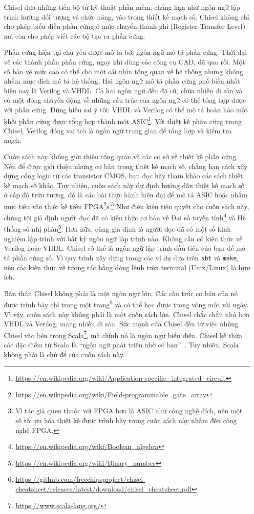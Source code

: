\documentclass[%
    10pt,
    headinclude, footexclude,
    openright, %
    notitlepage,
    cleardoubleempty,
    headsepline,
    pointlessnumbers,
    bibtotoc, idxtotoc,
    ]{scrbook}
\newcommand{\code}[1]{{\small{\texttt{#1}}}}
\newcommand{\myref}[2]{\href{#1}{#2}}
\renewcommand{\myref}[2]{{#2}{\footnote{\url{#1}}}}
\begin{document}
Chisel đưa những tiến bộ từ kỹ thuật phần mềm, chẳng hạn như ngôn ngữ lập trình hướng đối tượng và chức năng, vào trong thiết kế mạch số. Chisel không chỉ cho phép biểu diễn phần cứng ở mức-chuyển-thanh-ghi (Register-Transfer Level) mà còn cho phép viết các bộ tạo ra phần cứng.

Phần cứng hiện tại chủ yếu được mô tả bởi ngôn ngữ mô tả phần cứng. Thời đại vẽ các thành phần phần cứng, ngay khi dùng các công cụ CAD, đã qua rồi. Một số bản vẽ mức cao có thể cho một cái nhìn tổng quan về hệ thống nhưng không nhằm mục đích mô tả hệ thống.
Hai ngôn ngữ mô tả phần cứng phổ biến nhất hiện nay là Verilog và VHDL. Cả hai ngôn ngữ đều đã cũ, chứa nhiều di sản và có một dòng chuyển động về những cấu trúc của ngôn ngữ có thể tổng hợp được với phần cứng.
Đừng hiểu sai ý tôi: VHDL và Verilog có thể mô tả hoàn hảo một khối phần cứng được tổng hợp thành một
\myref{https://en.wikipedia.org/wiki/Application-specific_integrated_circuit}{ASIC}.
Với thiết kế phần cứng trong Chisel, Verilog đóng vai trò là ngôn ngữ trung gian để tổng hợp và kiểm tra mạch.

Cuốn sách này không giới thiệu tổng quan và các cơ sở về thiết kế phần cứng. Nên để được giới thiệu những cơ bản trong thiết kế mạch số, chẳng hạn cách xây dựng cổng logic từ các transistor CMOS, bạn đọc hãy tham khảo các sách thiết kế mạch số khác.
Tuy nhiên, cuốn sách này dự định hướng dẫn thiết kế mạch số ở cấp độ trừu tượng, đó là các bài thực hành hiện đại để mô tả ASIC hoặc nhắm mục tiêu vào thiết kế trên \myref{https://en.wikipedia.org/wiki/Field-programmable_gate_array}{FPGA}s.\footnote{Vì tác giả quen thuộc với FPGA hơn là ASIC như công nghệ đích, nên một số tối ưu hóa thiết kế được trình bày trong cuốn sách này nhắm đến công nghệ FPGA.}
Như điều kiện tiên quyết cho cuốn sách này, chúng tôi giả định người đọc đã có kiến thức cơ bản về
\myref{https://en.wikipedia.org/wiki/Boolean_algebra}{Đại số tuyến tính} và
\myref{https://en.wikipedia.org/wiki/Binary_number}{Hệ thống số nhị phân}.
Hơn nữa, cũng giả định là người đọc đã có một số kinh nghiệm lập trình với bất kỳ ngôn ngữ lập trình nào.
Không cần có kiến thức về Verilog hoặc VHDL.
Chisel có thể là ngôn ngữ lập trình đầu tiên của bạn để mô tả phần cứng số. Vì quy trình xây dựng trong các ví dụ dựa trên \code{sbt} và \code{make},
nên các kiến thức về tương tác bằng dòng lệnh trên terminal (Unix/Linux) là hữu ích.

Bản thân Chisel không phải là một ngôn ngữ lớn. Các cấu trúc cơ bản của nó được trình bày chỉ trong 
\myref{https://github.com/freechipsproject/chisel-cheatsheet/releases/latest/download/chisel_cheatsheet.pdf}{một trang}
và có thể học được trong vòng một vài ngày.
Vì vậy, cuốn sách này không phải là một cuốn sách lớn. 
Chisel chắc chắn nhỏ hơn VHDL và Verilog, mang nhiều di sản.
Sức mạnh của Chisel đến từ việc nhúng Chisel vào bên trong
\myref{https://www.scala-lang.org/}{Scala}, mà chính nó là ngôn ngữ biểu diễn.
Chisel kế thừa các đặc điểm từ Scala là ``ngôn ngữ phát triển nhờ có bạn''~\cite{Scala}.
Tuy nhiên, Scala không phải là chủ để của cuốn sách này.
\end{document}
